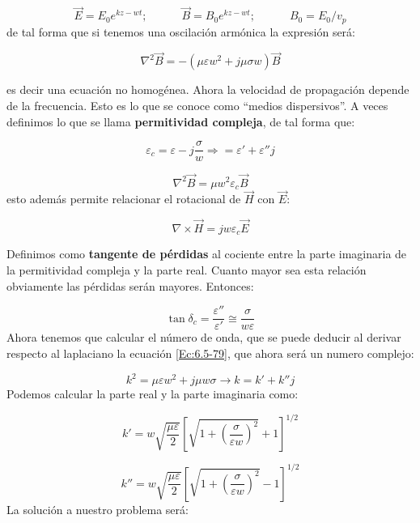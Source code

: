 \documentclass[12pt]{article}
\newcommand{\parentesis}[1]{\left( #1  \right)}
\newcommand{\tquad}{\quad \quad \quad}
\newcommand{\rota}{\nabla \times}
\begin{document}
$$ \vec{E} = E_0 e^{kz-wt}; \tquad \vec{B} = B_0 e^{kz-wt}; \tquad B_0 = E_0/v_p  $$
de tal forma que si tenemos una oscilación armónica la expresión será:

\begin{equation}
\nabla^2 \vec{B} = - (\mu \varepsilon w^2 + j \mu \sigma w) \vec{B} \label{Ec:6.5-79} 
\end{equation}

es decir una ecuación no homogénea. Ahora la velocidad de propagación depende de la frecuencia. Esto es lo que se conoce como ``medios dispersivos''. A veces definimos lo que se llama \textbf{permitividad compleja}, de tal forma que:

\begin{equation}
\varepsilon_c = \varepsilon - j \dfrac{\sigma}{w} \Longrightarrow = \varepsilon' + \varepsilon'' j
\end{equation}

\begin{equation}
\nabla^2 \vec{B} = \mu w^2 \varepsilon_c \vec{B}
\end{equation}
esto además permite relacionar el rotacional de $\vec{H}$ con $\vec{E}$:

$$ \rota \vec{H} = j w \varepsilon_c  \vec{E}$$

Definimos como \textbf{tangente de pérdidas} al cociente entre la parte imaginaria de la permitividad compleja y la parte real. Cuanto mayor sea esta relación obviamente las pérdidas serán mayores. Entonces:

\begin{equation}
\tan \delta_c = \dfrac{\varepsilon ''}{ \varepsilon ' } \cong \dfrac{\sigma}{w \varepsilon}
\end{equation} 
Ahora tenemos que calcular el número de onda, que se puede deducir al derivar respecto al laplaciano la ecuación \ref{Ec:6.5-79}, que ahora será un numero complejo:

\begin{equation}
k^2 = \mu \varepsilon w^2 + j \mu w \sigma \longrightarrow k = k' + k'' j
\end{equation}
Podemos calcular la parte real y la parte imaginaria como:

$$ k' = w \sqrt{\dfrac{\mu \varepsilon}{2}} \left[ \sqrt{1+\parentesis{\dfrac{\sigma}{\varepsilon w}}^2} +1 \right]^{1/2} $$

$$k'' = w \sqrt{\dfrac{\mu \varepsilon}{2}} \left[ \sqrt{1+\parentesis{\dfrac{\sigma}{\varepsilon w}}^2} -1 \right]^{1/2} $$
La solución a nuestro problema será:
\end{document}
